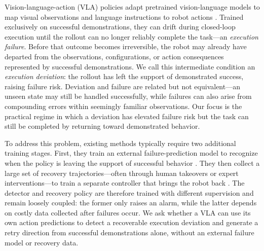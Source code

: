 \documentclass[letterpaper, 10 pt, conference]{ieeeconf}
\begin{document}
Vision-language-action (VLA) policies adapt pretrained vision-language models to map visual observations and language instructions to robot actions \cite{rt2,openvla,starvla}. Trained exclusively on successful demonstrations, they can drift during closed-loop execution until the rollout can no longer reliably complete the task---an \emph{execution failure}. Before that outcome becomes irreversible, the robot may already have departed from the observations, configurations, or action consequences represented by successful demonstrations. We call this intermediate condition an \emph{execution deviation}: the rollout has left the support of demonstrated success, raising failure risk. Deviation and failure are related but not equivalent---an unseen state may still be handled successfully, while failures can also arise from compounding errors within seemingly familiar observations. Our focus is the practical regime in which a deviation has elevated failure risk but the task can still be completed by returning toward demonstrated behavior.

To address this problem, existing methods typically require two additional training stages. First, they train an external failure-prediction model to recognize when the policy is leaving the support of successful behavior \cite{faildetect}. They then collect a large set of recovery trajectories---often through human takeovers or expert interventions---to train a separate controller that brings the robot back \cite{dagger,sirius,intervengen}. The detector and recovery policy are therefore trained with different supervision and remain loosely coupled: the former only raises an alarm, while the latter depends on costly data collected after failures occur. We ask whether a VLA can use its own action predictions to detect a recoverable execution deviation and generate a retry direction from successful demonstrations alone, without an external failure model or recovery data.
\end{document}
